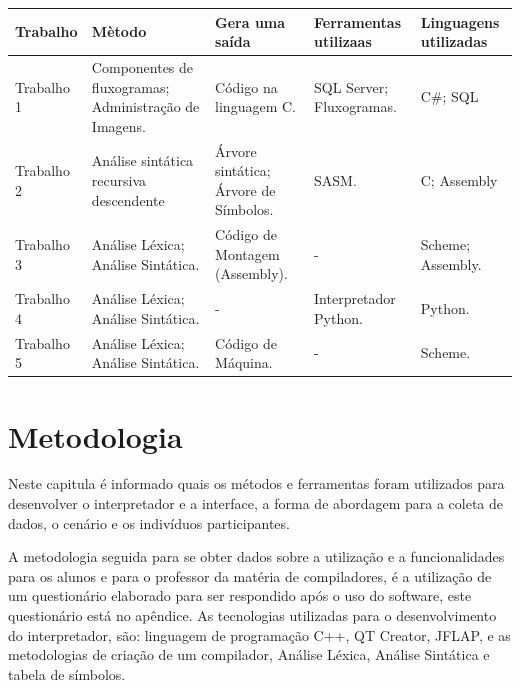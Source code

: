 \documentclass[12pt,oneside,a4paper,chapter=TITLE,section=TITLE,sumario=tradicional]{abntex2}
\begin{document}
\begin{quadro}[htb]
    \centering
    \vspace{0.5cm}
    \begin{tabular}{|p{3.0cm}|p{3.0cm}|p{3.0cm}|p{3.0cm}|p{3.0cm}|}
        \hline
        \textbf{Trabalho} & \textbf{Mètodo} & \textbf{Gera uma saída} & \textbf{Ferramentas utilizaas} & \textbf{Linguagens utilizadas} \\ 
        \hline\hline
        Trabalho 1 & Componentes de fluxogramas; Administração de Imagens. & Código na linguagem C.   &  SQL Server; Fluxogramas. & C\#; SQL    \\ \hline 
        Trabalho 2 & Análise sintática recursiva descendente    & Árvore sintática; Árvore de Símbolos.   & SASM.  & C; Assembly  \\ \hline
        Trabalho 3 & Análise Léxica;  Análise Sintática.   & Código de Montagem (Assembly).  &  -  & Scheme; Assembly.  \\ \hline
        Trabalho 4 & Análise Léxica;  Análise Sintática.   & -   &  Interpretador Python.  & Python.   \\ \hline
        Trabalho 5 & Análise Léxica;  Análise Sintática.   &  Código de Máquina.   & -   & Scheme.   \\ \hline
    \end{tabular}

    
\end{quadro}



\chapter{Metodologia}
\label{cap:metodologia}

Neste capitula é informado quais os métodos e ferramentas foram utilizados para desenvolver o interpretador e a interface, a forma de abordagem para a coleta de dados, o cenário e os indivíduos participantes.

A metodologia seguida para se obter dados sobre a utilização e a funcionalidades para os alunos e para o professor da matéria de compiladores, é a utilização de um questionário elaborado para ser respondido após o uso do software, este questionário está no apêndice.
As tecnologias utilizadas para o desenvolvimento do interpretador, são: linguagem de programação C++, QT Creator, JFLAP, e as metodologias de criação de um compilador, Análise Léxica, Análise Sintática e tabela de símbolos.  
\end{document}

